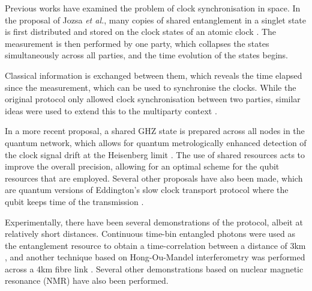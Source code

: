Previous works have examined the problem of clock synchronisation in space. In the proposal of Jozsa \textit{et al.}, many copies of shared entanglement in a singlet state is first distributed and stored on the clock states of an atomic clock \cite{bib:jozsa00}. The measurement is then performed by one party, which collapses the states simultaneously across all parties, and the time evolution of the states begins.

Classical information is exchanged between them, which reveals the time elapsed since the measurement, which can be used to synchronise the clocks. While the original protocol only allowed clock synchronisation between two parties, similar ideas were used to extend this to the multiparty context \cite{bib:krvco2002quantum, bib:ben2011optimized, bib:ren2012clock}.

In a more recent proposal, a shared GHZ state is prepared across all nodes in the quantum network, which allows for quantum metrologically enhanced detection of the clock signal drift at the Heisenberg limit \cite{bib:komar14}. The use of shared resources acts to improve the overall precision, allowing for an optimal scheme for the qubit resources that are employed. Several other proposals have also been made, which are quantum versions of Eddington's slow clock transport protocol where the qubit keeps time of the transmission \cite{bib:chuang2000quantum, bib:tavakoli2015quantum}. 

Experimentally, there have been several demonstrations of the protocol, albeit at relatively short distances. Continuous time-bin entangled photons were used as the entanglement resource to obtain a time-correlation between a distance of 3km \cite{bib:valencia2004distant}, and another technique based on Hong-Ou-Mandel interferometry was performed across a 4km fibre link \cite{bib:quan2016demonstration}. Several other demonstrations based on nuclear magnetic resonance (NMR) \cite{bib:zhang2004nuclear, bib:kong2017implementation} have also been performed. 

